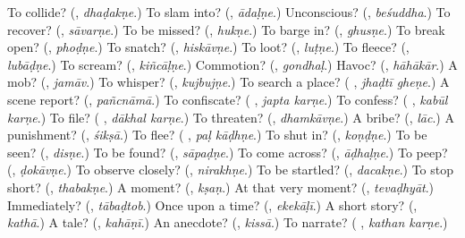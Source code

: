 \begin{tcolorbox}[breakable,colback=teal!4,colframe=teal!35!black,title={Before you move on}]
To collide? (\textbf{}, \emph{dhaḍakṇe}.) To slam into? (\textbf{}, \emph{ādaḷṇe}.) Unconscious? (\textbf{}, \emph{beśuddha}.) To recover? (\textbf{}, \emph{sāvarṇe}.) To be missed? (\textbf{}, \emph{hukṇe}.) To barge in? (\textbf{}, \emph{ghusṇe}.) To break open? (\textbf{}, \emph{phoḍṇe}.) To snatch? (\textbf{}, \emph{hiskāvṇe}.) To loot? (\textbf{}, \emph{luṭṇe}.) To fleece? (\textbf{}, \emph{lubāḍṇe}.) To scream? (\textbf{}, \emph{kiñcāḷṇe}.) Commotion? (\textbf{}, \emph{gondhaḷ}.) Havoc? (\textbf{}, \emph{hāhākār}.) A mob? (\textbf{}, \emph{jamāv}.) To whisper? (\textbf{}, \emph{kujbujṇe}.) To search a place? (\textbf{ }, \emph{jhaḍtī gheṇe}.) A scene report? (\textbf{}, \emph{pañcnāmā}.) To confiscate? (\textbf{ }, \emph{japta karṇe}.) To confess? (\textbf{ }, \emph{kabūl karṇe}.) To file? (\textbf{ }, \emph{dākhal karṇe}.) To threaten? (\textbf{}, \emph{dhamkāvṇe}.) A bribe? (\textbf{}, \emph{lāc}.) A punishment? (\textbf{}, \emph{śikṣā}.) To flee? (\textbf{ }, \emph{paḷ kāḍhṇe}.) To shut in? (\textbf{}, \emph{koṇḍṇe}.) To be seen? (\textbf{}, \emph{disṇe}.) To be found? (\textbf{}, \emph{sāpaḍṇe}.) To come across? (\textbf{}, \emph{āḍhaḷṇe}.) To peep? (\textbf{}, \emph{ḍokāvṇe}.) To observe closely? (\textbf{}, \emph{nirakhṇe}.) To be startled? (\textbf{}, \emph{dacakṇe}.) To stop short? (\textbf{}, \emph{thabakṇe}.) A moment? (\textbf{}, \emph{kṣaṇ}.) At that very moment? (\textbf{}, \emph{tevaḍhyāt}.) Immediately? (\textbf{}, \emph{tābaḍtob}.) Once upon a time? (\textbf{}, \emph{ekekāḷī}.) A short story? (\textbf{}, \emph{kathā}.) A tale? (\textbf{}, \emph{kahāṇī}.) An anecdote? (\textbf{}, \emph{kissā}.) To narrate? (\textbf{ }, \emph{kathan karṇe}.)
\end{tcolorbox}
